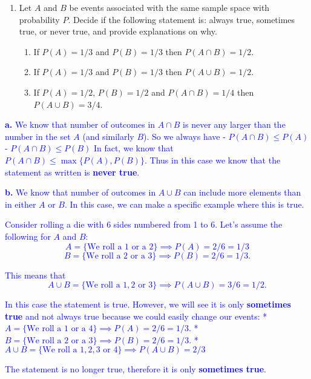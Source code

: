 \documentclass[
]{article}
\providecommand{\tightlist}{%
  \setlength{\itemsep}{0pt}\setlength{\parskip}{0pt}}
\begin{document}
\begin{enumerate}
\def\labelenumi{\arabic{enumi}.}
\item
  Let \(A\) and \(B\) be events associated with the same sample space with probability \(P\). Decide if the following statement is: always true, sometimes true, or never true, and provide explanations on why.

  \begin{enumerate}
  \def\labelenumii{\alph{enumii}.}
  \tightlist
  \item
    If \(P(A) = 1/3\) and \(P(B) = 1/3\) then \(P(A \cap B) = 1/2\).
  \item
    If \(P(A) = 1/3\) and \(P(B) = 1/3\) then \(P(A \cup B) = 1/2.\)
  \item
    If \(P(A) = 1/2\), \(P(B)= 1/2\) and \(P(A \cap B) = 1/4\) then \(P( A \cup B) =3/4\).
  \end{enumerate}
\end{enumerate}

\textcolor{blue}{\textbf{a.} We know that number of outcomes in $A \cap B$ is never any larger than the number in the set $A$ (and similarly $B$). So we always have 
- $P(A \cap B) \leq P(A)$
- $P(A \cap B) \leq P(B)$
In fact, we know that $P(A \cap B) \leq \max\{ P(A), P(B) \}.$ Thus in this case we know that the statement as written is \textbf{never true}.}

\textcolor{blue}{\textbf{b.} We know that number of outcomes in $A \cup B$ can include more elements than in either $A$ or $B$. In this case, we can make a specific example where this is true.}

\textcolor{blue}{Consider rolling a die with 6 sides numbered from 1 to 6. Let's assume the following for $A$ and $B$:
$$A = \{ \text{We roll a  } 1 \text{ or a } 2\} \implies P(A) = 2/6 = 1/3$$
$$B = \{ \text{We roll a  } 2 \text{ or a } 3\} \implies P(B) = 2/6 = 1/3.$$}

\textcolor{blue}{This means that
$$A \cup B = \{ \text{We roll a } 1,2 \text{ or } 3 \} \implies P(A\cup B) = 3/6 = 1/2.$$}

\textcolor{blue}{In this case the statement is true. However, we will see it is only \textbf{sometimes true} and not always true because we could easily change our events:
* $A = \{ \text{We roll a  } 1 \text{ or a } 4\} \implies P(A) = 2/6 = 1/3.$
* $B = \{ \text{We roll a  } 2 \text{ or a } 3\} \implies P(B) = 2/6 = 1/3.$
* $A \cup B = \{ \text{We roll a } 1,2,3 \text{ or } 4 \} \implies P(A \cup B) = 2/3$}

\textcolor{blue}{The statement is no longer true, therefore it is only \textbf{sometimes true}.}
\end{document}
